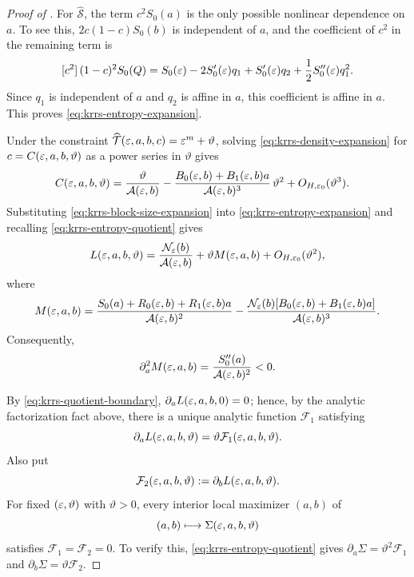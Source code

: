 \begin{proof}[Proof of ]
For \(\widehat{\mathcal S}\), the term \(c^2S_0(a)\) is the only possible
nonlinear dependence on \(a\).  To see this, \(2c(1-c)S_0(b)\) is independent of
\(a\), and the coefficient of \(c^2\) in the remaining term is
\[
  [c^2]\,(1-c)^2S_0(Q)
  =S_0(\varepsilon)-2S_0'(\varepsilon)q_1+S_0'(\varepsilon)q_2
    +\frac12S_0''(\varepsilon)q_1^2.
\]
Since \(q_1\) is independent of \(a\) and \(q_2\) is affine in \(a\), this
coefficient is affine in \(a\).  This proves
\eqref{eq:krrs-entropy-expansion}.

Under the constraint
\(\widehat{\mathcal T}(\varepsilon,a,b,c)=\varepsilon^m+\vartheta\), solving
\eqref{eq:krrs-density-expansion} for
\(c=C(\varepsilon,a,b,\vartheta)\) as a power series in \(\vartheta\) gives
\begin{equation}\label{eq:krrs-block-size-expansion}
  \begin{aligned}
    C(\varepsilon,a,b,\vartheta)
    &=\frac{\vartheta}{\mathcal A(\varepsilon,b)}
      -\frac{B_0(\varepsilon,b)+B_1(\varepsilon,b)a}
             {\mathcal A(\varepsilon,b)^3}\,\vartheta^2
      +O_{H,\varepsilon_0}(\vartheta^3).
  \end{aligned}
\end{equation}
Substituting \eqref{eq:krrs-block-size-expansion} into
\eqref{eq:krrs-entropy-expansion} and recalling
\eqref{eq:krrs-entropy-quotient} gives
\begin{equation}\label{eq:krrs-quotient-expansion}
  L(\varepsilon,a,b,\vartheta)
  =\frac{\mathcal N_\varepsilon(b)}{\mathcal A(\varepsilon,b)}
    +\vartheta M(\varepsilon,a,b)+O_{H,\varepsilon_0}(\vartheta^2),
\end{equation}
where
\begin{equation}\label{eq:krrs-second-coefficient}
  M(\varepsilon,a,b)
  =\frac{S_0(a)+R_0(\varepsilon,b)+R_1(\varepsilon,b)a}
         {\mathcal A(\varepsilon,b)^2}
   -\frac{\mathcal N_\varepsilon(b)
          [B_0(\varepsilon,b)+B_1(\varepsilon,b)a]}
         {\mathcal A(\varepsilon,b)^3}.
\end{equation}
Consequently,
\begin{equation}\label{eq:krrs-coefficient-concavity}
  \partial_a^2M(\varepsilon,a,b)
  =\frac{S_0''(a)}{\mathcal A(\varepsilon,b)^2}<0.
\end{equation}

By \eqref{eq:krrs-quotient-boundary}, \(\partial_aL(\varepsilon,a,b,0)=0\); hence, by the
analytic factorization fact above, there is a unique analytic function
\(\mathcal F_1\) satisfying
\begin{equation}\label{eq:krrs-small-block-stationarity}
  \partial_aL(\varepsilon,a,b,\vartheta)
  =\vartheta\mathcal F_1(\varepsilon,a,b,\vartheta).
\end{equation}
Also put
\begin{equation}\label{eq:krrs-cross-block-stationarity}
  \mathcal F_2(\varepsilon,a,b,\vartheta)
  :=\partial_bL(\varepsilon,a,b,\vartheta).
\end{equation}
For fixed \((\varepsilon,\vartheta)\) with \(\vartheta>0\), every interior local
maximizer \((a,b)\) of
\[
  (a,b)\longmapsto\Sigma(\varepsilon,a,b,\vartheta)
\]
satisfies \(\mathcal F_1=\mathcal F_2=0\).  To verify this,
\eqref{eq:krrs-entropy-quotient} gives
\(\partial_a\Sigma=\vartheta^2\mathcal F_1\) and
\(\partial_b\Sigma=\vartheta\mathcal F_2\).


\end{proof}
